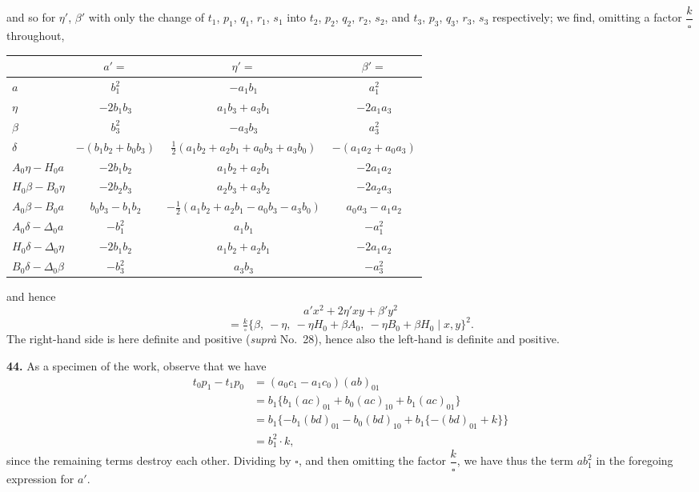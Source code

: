 \documentclass[11pt]{article}
\begin{document}
\medskip
and so for $\eta'$, $\beta'$ with only the change of $t_{1}$, $p_{1}$, $q_{1}$, $r_{1}$, $s_{1}$ into $t_{2}$, $p_{2}$, $q_{2}$, $r_{2}$, $s_{2}$, and $t_{3}$, $p_{3}$, $q_{3}$, $r_{3}$, $s_{3}$ respectively; we find, omitting a factor $\dfrac{k}{\square}$ throughout,

\begin{center}
\begin{tabular}{|l|c|c|c|}
\hline
& $a'=$ & $\eta'=$ & $\beta'=$\\
\hline
$a$ & $b_{1}^{2}$ & $-a_{1}b_{1}$ & $a_{1}^{2}$\\
$\eta$ & $-2b_{1}b_{3}$ & $a_{1}b_{3}+a_{3}b_{1}$ & $-2a_{1}a_{3}$\\
$\beta$ & $b_{3}^{2}$ & $-a_{3}b_{3}$ & $a_{3}^{2}$\\
$\delta$ & $-(b_{1}b_{2}+b_{0}b_{3})$ & $\tfrac{1}{2}(a_{1}b_{2}+a_{2}b_{1}+a_{0}b_{3}+a_{3}b_{0})$ & $-(a_{1}a_{2}+a_{0}a_{3})$\\
$A_{0}\eta-H_{0}a$ & $-2b_{1}b_{2}$ & $a_{1}b_{2}+a_{2}b_{1}$ & $-2a_{1}a_{2}$\\
$H_{0}\beta-B_{0}\eta$ & $-2b_{2}b_{3}$ & $a_{2}b_{3}+a_{3}b_{2}$ & $-2a_{2}a_{3}$\\
$A_{0}\beta-B_{0}a$ & $b_{0}b_{3}-b_{1}b_{2}$ & $-\tfrac{1}{2}(a_{1}b_{2}+a_{2}b_{1}-a_{0}b_{3}-a_{3}b_{0})$ & $a_{0}a_{3}-a_{1}a_{2}$\\
$A_{0}\delta-\Delta_{0}a$ & $-b_{1}^{2}$ & $a_{1}b_{1}$ & $-a_{1}^{2}$\\
$H_{0}\delta-\Delta_{0}\eta$ & $-2b_{1}b_{2}$ & $a_{1}b_{2}+a_{2}b_{1}$ & $-2a_{1}a_{2}$\\
$B_{0}\delta-\Delta_{0}\beta$ & $-b_{3}^{2}$ & $a_{3}b_{3}$ & $-a_{3}^{2}$\\
\hline
\end{tabular}
\end{center}

and hence
\[
a'x^{2}+2\eta'xy+\beta'y^{2}
\]
\[
=\tfrac{k}{\square}\{\beta,\ -\eta,\ -\eta H_{0}+\beta A_{0},\ -\eta B_{0}+\beta H_{0}\mid x,y\}^{2}.
\]
The right-hand side is here definite and positive (\textit{supr\`a} No.~28), hence also the left-hand is definite and positive.

\medskip
\noindent\textbf{44.} As a specimen of the work, observe that we have
\begin{align*}
t_{0}p_{1}-t_{1}p_{0} &= (a_{0}c_{1}-a_{1}c_{0})(ab)_{01}\\
 &= b_{1}\{b_{1}(ac)_{01}+b_{0}(ac)_{10}+b_{1}(ac)_{01}\}\\
 &= b_{1}\{-b_{1}(bd)_{01}-b_{0}(bd)_{10}+b_{1}\{-(bd)_{01}+k\}\}\\
 &= b_{1}^{2}\cdot k,
\end{align*}
since the remaining terms destroy each other. Dividing by $\square$, and then omitting the factor $\dfrac{k}{\square}$, we have thus the term $ab_{1}^{2}$ in the foregoing expression for $a'$.
\end{document}
